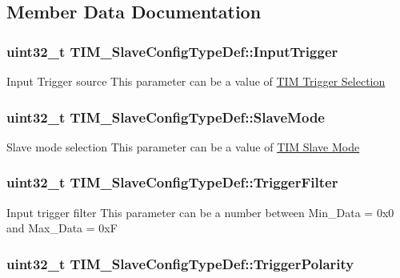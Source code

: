 \subsection{Member Data Documentation}
\hypertarget{struct_t_i_m___slave_config_type_def_a82efdad1e2ed9edbd4c895987ebfe0f7}{
\subsubsection[{Input\-Trigger}]{\setlength{\rightskip}{0pt plus 5cm}uint32\-\_\-t T\-I\-M\-\_\-\-Slave\-Config\-Type\-Def\-::\-Input\-Trigger}}\label{struct_t_i_m___slave_config_type_def_a82efdad1e2ed9edbd4c895987ebfe0f7}
Input Trigger source This parameter can be a value of \hyperlink{group___t_i_m___trigger___selection}{T\-I\-M Trigger Selection} \hypertarget{struct_t_i_m___slave_config_type_def_a2792de155698128ade1e505618c1bc43}{
\subsubsection[{Slave\-Mode}]{\setlength{\rightskip}{0pt plus 5cm}uint32\-\_\-t T\-I\-M\-\_\-\-Slave\-Config\-Type\-Def\-::\-Slave\-Mode}}\label{struct_t_i_m___slave_config_type_def_a2792de155698128ade1e505618c1bc43}
Slave mode selection This parameter can be a value of \hyperlink{group___t_i_m___slave___mode}{T\-I\-M Slave Mode} \hypertarget{struct_t_i_m___slave_config_type_def_a07d28f704576a41e37bbb7412e0fba60}{
\subsubsection[{Trigger\-Filter}]{\setlength{\rightskip}{0pt plus 5cm}uint32\-\_\-t T\-I\-M\-\_\-\-Slave\-Config\-Type\-Def\-::\-Trigger\-Filter}}\label{struct_t_i_m___slave_config_type_def_a07d28f704576a41e37bbb7412e0fba60}
Input trigger filter This parameter can be a number between Min\-\_\-\-Data = 0x0 and Max\-\_\-\-Data = 0x\-F \hypertarget{struct_t_i_m___slave_config_type_def_afa8fa1801ef5e13115732a495ef11165}{
\subsubsection[{Trigger\-Polarity}]{\setlength{\rightskip}{0pt plus 5cm}uint32\-\_\-t T\-I\-M\-\_\-\-Slave\-Config\-Type\-Def\-::\-Trigger\-Polarity}}\label{struct_t_i_m___slave_config_type_def_afa8fa1801ef5e13115732a495ef11165}
